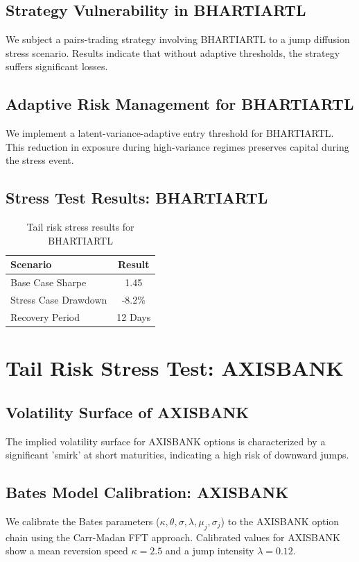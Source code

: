 \documentclass[12pt,a4paper,twoside]{article}
\begin{document}
\subsection{Strategy Vulnerability in BHARTIARTL}
We subject a pairs-trading strategy involving BHARTIARTL to a jump diffusion stress scenario. Results indicate that without adaptive thresholds, the strategy suffers significant losses.
\subsection{Adaptive Risk Management for BHARTIARTL}
We implement a latent-variance-adaptive entry threshold for BHARTIARTL. This reduction in exposure during high-variance regimes preserves capital during the stress event.
\subsection{Stress Test Results: BHARTIARTL}
\begin{table}[H]
\centering
\begin{tabular}{|l|c|}
\hline
Scenario & Result \\
\hline
Base Case Sharpe & 1.45 \\
Stress Case Drawdown & -8.2\% \\
Recovery Period & 12 Days \\
\hline
\end{tabular}
\caption{Tail risk stress results for BHARTIARTL}
\end{table}
\newpage

\section{Tail Risk Stress Test: AXISBANK}
\subsection{Volatility Surface of AXISBANK}
The implied volatility surface for AXISBANK options is characterized by a significant 'smirk' at short maturities, indicating a high risk of downward jumps.
\subsection{Bates Model Calibration: AXISBANK}
We calibrate the Bates parameters ($\kappa, \theta, \sigma, \lambda, \mu_j, \sigma_j$) to the AXISBANK option chain using the Carr-Madan FFT approach.
Calibrated values for AXISBANK show a mean reversion speed $\kappa = 2.5$ and a jump intensity $\lambda = 0.12$.
\end{document}
